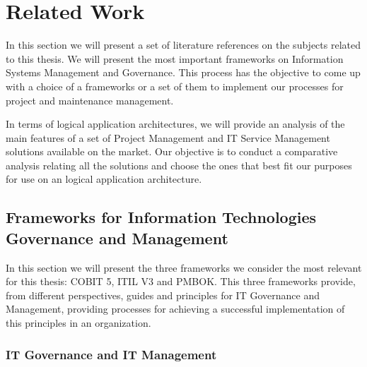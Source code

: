 
% 
% 

\section{Related Work}

In this section we will present a set of literature references on the subjects related to this thesis. We will present the most important frameworks on Information Systems Management and Governance. This process has the objective to come up with a choice of a frameworks or a set of them to implement our processes for project and maintenance management.\par
In terms of logical application architectures, we will provide an analysis of the main features of a set of Project Management and IT Service Management solutions available on the market. Our objective is to conduct a comparative analysis relating all the solutions and choose the ones that best fit our purposes for use on an logical application architecture.  

\subsection{Frameworks for Information Technologies Governance and Management}

In this section we will present the three frameworks we consider the most relevant for this thesis: COBIT 5, ITIL V3 and PMBOK. This three frameworks provide, from different perspectives, guides and principles for IT Governance and Management, providing processes for achieving a successful implementation of this principles in an organization.\par


\subsubsection{IT Governance and IT Management}

